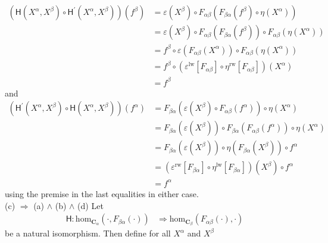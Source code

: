 \begin{prf}
\begin{align*}
  \left(
    \mathsf{H}(X^{\alpha},X^{\beta})
    \circ
    \mathsf{H}^{\prime}(X^{\alpha},X^{\beta})
  \right)
  (f^{\beta})
  &=
  \varepsilon(X^{\beta})
  \circ
  F_{\alpha\beta}
  \left(
    F_{\beta\alpha}(f^{\beta})
    \circ
    \eta(X^{\alpha})
  \right)
  \\
  &=
  \varepsilon(X^{\beta})
  \circ
  F_{\alpha\beta}
  \left(
    F_{\beta\alpha}(f^{\beta})
  \right)
  \circ
  F_{\alpha\beta}
  \left(
    \eta(X^{\alpha})
  \right)
  \\
  &=
  f^{\beta}
  \circ
  \varepsilon
  \left(
    F_{\alpha\beta}(X^{\alpha})
  \right)
  \circ
  F_{\alpha\beta}
  \left(
    \eta(X^{\alpha})
  \right)
  \tag{NT}
  \\
  &=
  f^{\beta}
  \circ
  \left(
    \varepsilon^{\textrm{lw}}[F_{\alpha\beta}]
    \circ
    \eta^{\textrm{rw}}[F_{\alpha\beta}]
  \right)
  (X^{\alpha})
  \\
  &=
  f^{\beta}
\end{align*}
and
\begin{align*}
  \left(
    \mathsf{H}^{\prime}(X^{\alpha},X^{\beta})
    \circ
    \mathsf{H}(X^{\alpha},X^{\beta})
  \right)
  (f^{\alpha})
  &=
  F_{\beta\alpha}
  \left(
    \varepsilon(X^{\beta})
    \circ
    F_{\alpha\beta}(f^{\alpha})
  \right)
  \circ
  \eta(X^{\alpha})
  \\
  &=
  F_{\beta\alpha}
  \left(
    \varepsilon(X^{\beta})
  \right)
  \circ
  F_{\beta\alpha}
  \left(
    F_{\alpha\beta}(f^{\alpha})
  \right)
  \circ
  \eta(X^{\alpha})
  \\
  &=
  F_{\beta\alpha}
  \left(
    \varepsilon(X^{\beta})
  \right)
  \circ
  \eta
  \left(
    F_{\beta\alpha}(X^{\beta})
  \right)
  \circ
  f^{\alpha}
  \tag{NT}
  \\
  &=
  \left(
    \varepsilon^{\textrm{rw}}[F_{\beta\alpha}]
    \circ
    \eta^{\textrm{lw}}[F_{\beta\alpha}]
  \right)
  (X^{\beta})
  \circ
  f^{\alpha}
  \\
  &=
  f^{\alpha}
\end{align*}
using the premise in the last equalities in either case.
\\
{\glqq}(c) $\Rightarrow$ (a) $\land$ (b) $\land$ (d){\grqq}
\qquad
Let
\begin{align*}
  \mathsf{H}
  \colon
  \mathrm{hom}_{\mathbf{C}_{\alpha}}(\cdot,F_{\beta\alpha}(\cdot))
  &\Rightarrow
  \mathrm{hom}_{\mathbf{C}_{\beta}}(F_{\alpha\beta}(\cdot),\cdot)
\end{align*}
be a natural isomorphism. Then define for all $X^{\alpha}$ and $X^{\beta}$

\end{prf}
